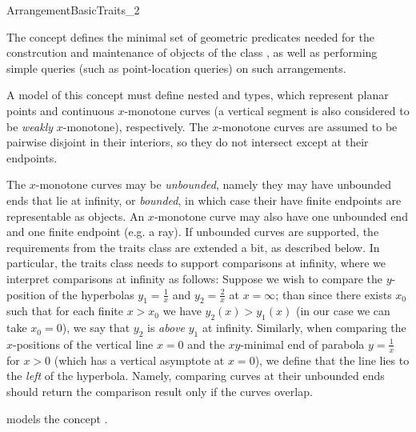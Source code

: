 
\ccRefPageBegin
\begin{ccRefConcept}{ArrangementBasicTraits_2}

\ccDefinition
The concept \ccRefName{} defines the minimal set of geometric
predicates needed for the constrcution and maintenance of objects of the
class , as well as performing simple queries (such as
point-location queries) on such arrangements.

A model of this concept must define nested  and
 types, which represent planar points and
continuous $x$-monotone curves (a vertical segment is also considered to be
{\sl weakly} $x$-monotone), respectively. The $x$-monotone curves are assumed
to be pairwise disjoint in their interiors, so they do not intersect
except at their endpoints.

The $x$-monotone curves may be {\em unbounded}, namely they may have unbounded
ends that lie at infinity, or {\em bounded}, in which case their have finite
endpoints are representable as  objects. An $x$-monotone curve
may also have one unbounded end and one finite endpoint (e.g. a ray).
If unbounded curves are supported, the requirements from the traits class
are extended a bit, as described below. In particular, the traits class needs
to support comparisons at infinity, where we interpret comparisons at infinity
as follows: Suppose we wish to compare the $y$-position of the hyperbolas
$y_1 = \frac{1}{x}$ and $y_2 = \frac{2}{x}$ at $x = \infty$; than since there
exists $x_0$ such that for each finite $x > x_0$ we have $y_2(x) > y_1(x)$
(in our case we can take $x_0 = 0$), we say that $y_2$ is {\em above} $y_1$ at
infinity. Similarly, when comparing the $x$-positions of the vertical line
$x = 0$ and the $xy$-minimal end of parabola $y = \frac{1}{x}$ for $x > 0$
(which has a vertical asymptote at $x = 0$), we define that the line lies to
the {\em left} of the hyperbola. Namely, comparing curves at their unbounded
ends should return the comparison result  only if the curves
overlap.


\ccTypes
\ccGlue
{}
  {models the concept .}


\end{ccRefConcept}
